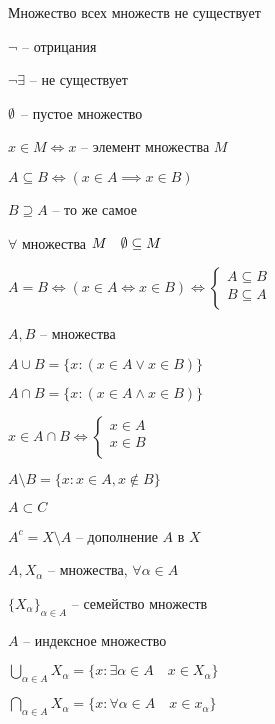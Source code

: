     \begin{note}
        Множество всех множеств не существует

        $\neg$ -- отрицания

        $\neg \exists $ -- не существует
        
        $\emptyset $ -- пустое множество

        $x\in M \iff x$ -- элемент множества $M$

        $A\subseteq B \iff  (x\in A \implies  x\in B)$

        $B\supseteq A$ -- то же самое
    \end{note}
    $\forall $ множества $M\quad \emptyset \subseteq M$

    $A = B \iff  \left( x\in A \iff x\in B \right)  \iff \begin{cases}
        A\subseteq B\\
        B\subseteq A\\
    \end{cases}$
    
    
        $A,B$ -- множества 

        $A\cup B = \{x: (x\in A \vee x\in B)\}$
        
        $A\cap B = \{x: (x\in A \wedge x\in B)\}$

        $x\in A\cap B \iff  \begin{cases}
            x\in A\\
            x\in B\\
        \end{cases}$

        $A\setminus B = \{x:x \in A, x\not\in B \}$

        $A\subset C$

        $A^c = X\setminus A$ -- дополнение $A$ в $X$

        \begin{definition}
            $A,X_{\alpha}$ -- множества, $\forall \alpha \in A$

            $\{X_{\alpha}\}_{\alpha\in A}$ -- семейство множеств

            $A$ -- индексное множество

            $\bigcup\limits_{\alpha\in A}X_{\alpha} = \{x:\exists \alpha\in A\quad x\in X_{\alpha}\} $

            $\bigcap\limits_{\alpha\in A}X_{\alpha} = \{x: \forall \alpha\in A\quad x\in x_{\alpha}\} $
        \end{definition}

